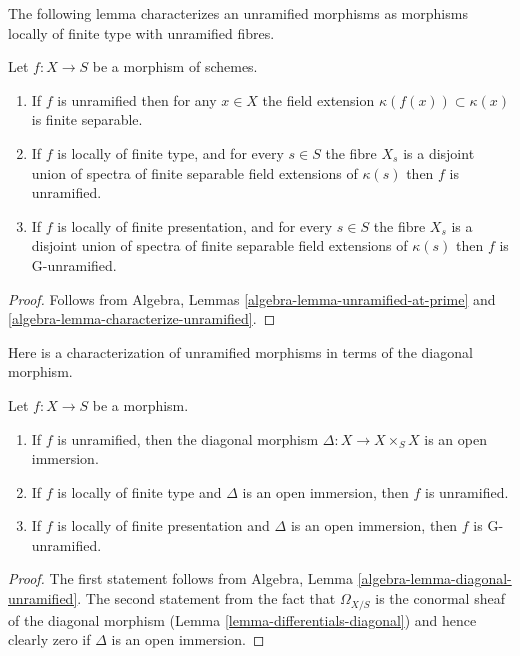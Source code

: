 \noindent
The following lemma characterizes an unramified morphisms as
morphisms locally of finite type with unramified fibres.

\begin{lemma}
\label{lemma-unramified-etale-fibres}
Let $f : X \to S$ be a morphism of schemes.
\begin{enumerate}
\item If $f$ is unramified then for any $x \in X$ the field extension
$\kappa(f(x)) \subset \kappa(x)$ is finite separable.
\item If $f$ is locally of finite type, and for every
$s \in S$ the fibre $X_s$ is a disjoint union of spectra of finite separable
field extensions of $\kappa(s)$ then $f$ is unramified.
\item If $f$ is locally of finite presentation, and for every
$s \in S$ the fibre $X_s$ is a disjoint union of spectra of finite separable
field extensions of $\kappa(s)$ then $f$ is G-unramified.
\end{enumerate}
\end{lemma}

\begin{proof}
Follows from Algebra, Lemmas
\ref{algebra-lemma-unramified-at-prime} and
\ref{algebra-lemma-characterize-unramified}.
\end{proof}

\noindent
Here is a characterization of unramified morphisms in terms of the
diagonal morphism.

\begin{lemma}
\label{lemma-diagonal-unramified-morphism}
Let $f : X \to S$ be a morphism.
\begin{enumerate}
\item If $f$ is unramified, then the diagonal morphism
$\Delta : X \to X \times_S X$ is an open immersion.
\item If $f$ is locally of finite type
and $\Delta$ is an open immersion, then $f$ is unramified.
\item If $f$ is locally of finite presentation and $\Delta$ is an open
immersion, then $f$ is G-unramified.
\end{enumerate}
\end{lemma}

\begin{proof}
The first statement follows from
Algebra, Lemma \ref{algebra-lemma-diagonal-unramified}.
The second statement from the fact that $\Omega_{X/S}$
is the conormal sheaf of the diagonal morphism
(Lemma \ref{lemma-differentials-diagonal})
and hence clearly zero if $\Delta$ is an open immersion.
\end{proof}


